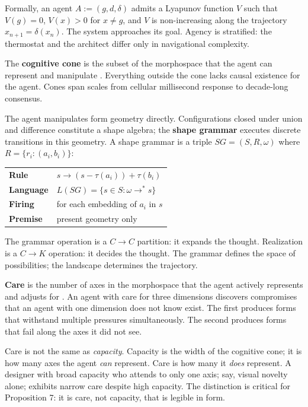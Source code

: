 Formally, an agent $A := (g, d, \delta)$ admits a Lyapunov function $V$ such that $V(g) = 0$, $V(x) > 0$ for $x \neq g$, and $V$ is non-increasing along the trajectory $x_{n+1} = \delta(x_n)$. The system approaches its goal. Agency is stratified: the thermostat and the architect differ only in navigational complexity.

The \textbf{cognitive cone} is the subset of the morphospace that the agent can represent and manipulate \parencite{Fields2022}. Everything outside the cone lacks causal existence for the agent. Cones span scales from cellular millisecond response to decade-long consensus.

The agent manipulates form geometry directly. Configurations closed under union and difference constitute a shape algebra; the \textbf{shape grammar} \parencite{Stiny1972} executes discrete transitions in this geometry. A shape grammar is a triple $SG = (S, R, \omega)$ where $R = \{r_i : (a_i, b_i)\}$:

\begin{center}\small
\begin{tabular}{@{}l@{\;\;}l@{}}
\textbf{Rule} & $s \!\to\! (s - \tau(a_i)) + \tau(b_i)$ \\[2pt]
\textbf{Language} & $L(SG) = \{s \!\in\! S : \omega \!\to^*\! s\}$ \\[2pt]
\textbf{Firing} & for each embedding of $a_i$ in $s$ \\
\textbf{Premise} & present geometry only \\
\end{tabular}
\end{center}

\noindent The grammar operation is a $C \to C$ partition: it expands the thought. Realization is a $C \to K$ operation: it decides the thought. The grammar defines the space of possibilities; the landscape determines the trajectory.

\textbf{Care} is the number of axes in the morphospace that the agent actively represents and adjusts for \parencite{Doctor2024}. An agent with care for three dimensions discovers compromises that an agent with one dimension does not know exist. The first produces forms that withstand multiple pressures simultaneously. The second produces forms that fail along the axes it did not see.

Care is not the same as \textit{capacity}. Capacity is the width of the cognitive cone; it is how many axes the agent \textit{can} represent. Care is how many it \textit{does} represent. A designer with broad capacity who attends to only one axis; say, visual novelty alone; exhibits narrow care despite high capacity. The distinction is critical for Proposition 7: it is care, not capacity, that is legible in form.

